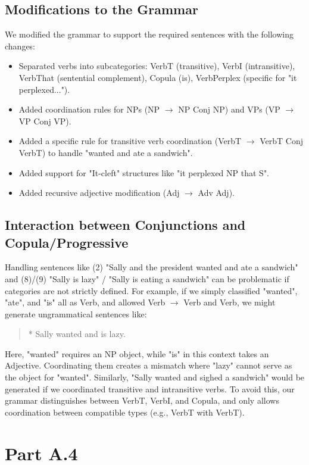 \documentclass{article}
\begin{document}
\subsection*{Modifications to the Grammar}
We modified the grammar to support the required sentences with the following changes:
\begin{itemize}
    \item Separated verbs into subcategories: VerbT (transitive), VerbI (intransitive), VerbThat (sentential complement), Copula (is), VerbPerplex (specific for "it perplexed...").
    \item Added coordination rules for NPs (NP $\to$ NP Conj NP) and VPs (VP $\to$ VP Conj VP).
    \item Added a specific rule for transitive verb coordination (VerbT $\to$ VerbT Conj VerbT) to handle "wanted and ate a sandwich".
    \item Added support for "It-cleft" structures like "it perplexed NP that S".
    \item Added recursive adjective modification (Adj $\to$ Adv Adj).
\end{itemize}

\subsection*{Interaction between Conjunctions and Copula/Progressive}
Handling sentences like (2) "Sally and the president wanted and ate a sandwich" and (8)/(9) "Sally is lazy" / "Sally is eating a sandwich" can be problematic if categories are not strictly defined.
For example, if we simply classified "wanted", "ate", and "is" all as Verb, and allowed Verb $\to$ Verb and Verb, we might generate ungrammatical sentences like:

\begin{quote}
    * Sally wanted and is lazy.
\end{quote}
Here, "wanted" requires an NP object, while "is" in this context takes an Adjective. Coordinating them creates a mismatch where "lazy" cannot serve as the object for "wanted".
Similarly, "Sally wanted and sighed a sandwich" would be generated if we coordinated transitive and intransitive verbs.
To avoid this, our grammar distinguishes between VerbT, VerbI, and Copula, and only allows coordination between compatible types (e.g., VerbT with VerbT).


\section*{Part A.4}
\end{document}
